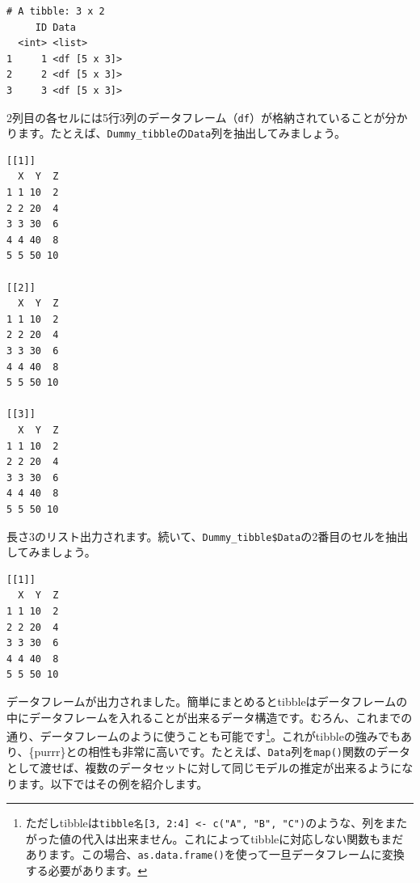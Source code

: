 \documentclass[
  a4paper,
  pandoc,
  ja=standard,
  jafont=haranoaji]{bxjsbook}
\newenvironment{Shaded}{\begin{snugshade}}{\end{snugshade}}
\newcommand{\DecValTok}[1]{\textcolor[rgb]{0.68,0.00,0.00}{#1}}
\newcommand{\NormalTok}[1]{\textcolor[rgb]{0.00,0.48,0.65}{#1}}
\newcommand{\SpecialCharTok}[1]{\textcolor[rgb]{0.37,0.37,0.37}{#1}}
\begin{document}
\begin{verbatim}
# A tibble: 3 x 2
     ID Data        
  <int> <list>      
1     1 <df [5 x 3]>
2     2 <df [5 x 3]>
3     3 <df [5 x 3]>
\end{verbatim}

2列目の各セルには5行3列のデータフレーム（\texttt{df}）が格納されていることが分かります。たとえば、\texttt{Dummy\_tibble}の\texttt{Data}列を抽出してみましょう。

\begin{Shaded}
\end{Shaded}

\begin{verbatim}
[[1]]
  X  Y  Z
1 1 10  2
2 2 20  4
3 3 30  6
4 4 40  8
5 5 50 10

[[2]]
  X  Y  Z
1 1 10  2
2 2 20  4
3 3 30  6
4 4 40  8
5 5 50 10

[[3]]
  X  Y  Z
1 1 10  2
2 2 20  4
3 3 30  6
4 4 40  8
5 5 50 10
\end{verbatim}

長さ3のリスト出力されます。続いて、\texttt{Dummy\_tibble\$Data}の2番目のセルを抽出してみましょう。

\begin{Shaded}
\end{Shaded}

\begin{verbatim}
[[1]]
  X  Y  Z
1 1 10  2
2 2 20  4
3 3 30  6
4 4 40  8
5 5 50 10
\end{verbatim}

データフレームが出力されました。簡単にまとめるとtibbleはデータフレームの中にデータフレームを入れることが出来るデータ構造です。むろん、これまでの通り、データフレームのように使うことも可能です\footnote{ただしtibbleは\texttt{tibble名{[}3,\ 2:4{]}\ \textless{}-\ c("A",\ "B",\ "C")}のような、列をまたがった値の代入は出来ません。これによってtibbleに対応しない関数もまだあります。この場合、\texttt{as.data.frame()}を使って一旦データフレームに変換する必要があります。}。これがtibbleの強みでもあり、\{purrr\}との相性も非常に高いです。たとえば、\texttt{Data}列を\texttt{map()}関数のデータとして渡せば、複数のデータセットに対して同じモデルの推定が出来るようになります。以下ではその例を紹介します。
\end{document}
